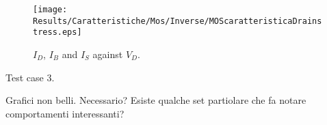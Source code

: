 \begin{figure}[!h]
\centering
\texttt{[image: Results/Caratteristiche/Mos/Inverse/MOScaratteristicaDrainstress.eps]}
\caption{$I_D$, $I_B$ and $I_S$ against $V_D$.}
\label{fig: tutte le correnti mos stress}
\end{figure}




Test case 3.

Grafici non belli. Necessario? Esiste qualche set partiolare che fa notare comportamenti interessanti?